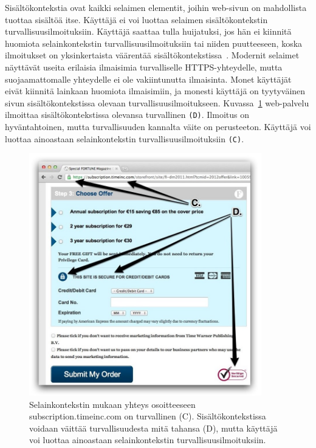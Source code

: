 \documentclass[finnish,gradu]{tktltiki}
\begin{document}
  Sisältökontekstia ovat kaikki selaimen elementit, joihin web-sivun on mahdollista tuottaa sisältöä itse. Käyttäjä ei voi luottaa selaimen sisältökontekstin turvallisuusilmoituksiin. Käyttäjä saattaa tulla huijatuksi, jos hän ei kiinnitä huomiota selainkontekstin turvallisuusilmoituksiin tai niiden puutteeseen, koska ilmoitukset on yksinkertaista väärentää sisältökontekstissa~\cite{why_phishing_works_06}. Modernit selaimet näyttävät useita erilaisia ilmaisimia turvalliselle HTTPS-yhteydelle, mutta suojaamattomalle yhteydelle ei ole vakiintunutta ilmaisinta. Monet käyttäjät eivät kiinnitä lainkaan huomiota ilmaisimiin, ja monesti käyttäjä on tyytyväinen sivun sisältökontekstissa olevaan turvallisuusilmoitukseen. Kuvassa~\ref{fig:trust_context_html} web-palvelu ilmoittaa sisältökontekstissa olevansa turvallinen \verb!(D)!. Ilmoitus on hyväntahtoinen, mutta turvallisuuden kannalta väite on perusteeton. Käyttäjä voi luottaa ainoastaan selainkontekstin turvallisuusilmoituksiin \verb!(C)!.

  \begin{figure}
    \centering
    \includegraphics[width=0.9\textwidth]{images/trust_context_html.jpg}
    \caption{Selainkontekstin mukaan yhteys osoitteeseen subscription.timeinc.com on turvallinen (C). Sisältökontekstissa voidaan väittää turvallisuudesta mitä tahansa (D), mutta käyttäjä voi luottaa ainoastaan selainkontekstin turvallisuusilmoituksiin.}
    \label{fig:trust_context_html}
  \end{figure}
\end{document}
